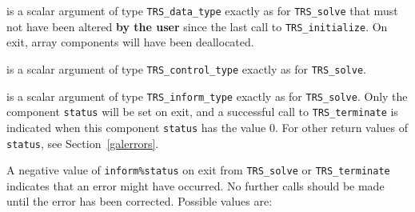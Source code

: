 \documentclass{galahad}
\newcommand{\packagename}{TRS}
\begin{document}
\begin{description}

 is a scalar \intentinout argument of type
{\tt \packagename\_data\_type}
exactly as for
{\tt \packagename\_solve}
that must not have been altered {\bf by the user} since the last call to
{\tt \packagename\_initialize}.
On exit, array components will have been deallocated.

 is a scalar \intentin argument of type
{\tt \packagename\_control\_type}
exactly as for
{\tt \packagename\_solve}.

 is a scalar \intentout argument of type
{\tt \packagename\_inform\_type}
exactly as for
{\tt \packagename\_solve}.
Only the component {\tt status} will be set on exit, and a
successful call to
{\tt \packagename\_terminate}
is indicated when this  component {\tt status} has the value 0.
For other return values of {\tt status}, see Section~\ref{galerrors}.

\end{description}


\galerrors
A negative value of  {\tt inform\%status} on exit from
{\tt \packagename\_solve}
or
{\tt \packagename\_terminate}
indicates that an error might have occurred. No further calls should be made
until the error has been corrected. Possible values are:
\end{document}
